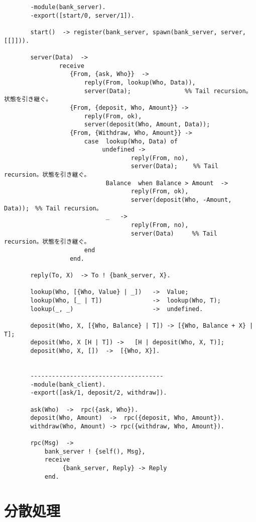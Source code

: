 \begin{verbatim}
    　　-module(bank_server).
    　　-export([start/0, server/1]).
    　　
    　　start()  -> register(bank_server, spawn(bank_server, server, [[]])).
    　　
    　　server(Data)  ->
    　　        receive
    　　           {From, {ask, Who}}  ->
    　　               reply(From, lookup(Who, Data)),
    　　               server(Data);　　　　　　　　　%% Tail recursion。状態を引き継ぐ。
    　　           {From, {deposit, Who, Amount}} -> 
    　　               reply(From, ok),
    　　               server(deposit(Who, Amount, Data));
    　　           {From, {Withdraw, Who, Amount}} ->
    　　               case  lookup(Who, Data) of 
    　　                    undefined ->
    　　                            reply(From, no),
    　　                            server(Data);　　 %% Tail recursion。状態を引き継ぐ。
    　　                     Balance  when Balance > Amount  ->
    　　                            reply(From, ok),
    　　                            server(deposit(Who, -Amount, Data));　%% Tail recursion。
    　　                     _   ->
    　　                            reply(From, no),
    　　                            server(Data)　　　%% Tail recursion。状態を引き継ぐ。
    　　               end
    　　           end.
    　　
    　　reply(To, X)  -> To ! {bank_server, X}.
    　　
    　　lookup(Who, [{Who, Value} | _])   ->  Value;
    　　lookup(Who, [_ | T])              ->  lookup(Who, T);
    　　lookup(_, _)                      ->  undefined.
    　　
    　　deposit(Who, X, [{Who, Balance} | T]) -> [{Who, Balance + X} | T];
    　　deposit(Who, X [H | T]) ->   [H | deposit(Who, X, T)];
    　　deposit(Who, X, [])  ->  [{Who, X}].
    　　
    　　
    　　-------------------------------------
    　　-module(bank_client).
    　　-export([ask/1, deposit/2, withdraw]).
    　　
    　　ask(Who)  ->  rpc({ask, Who}).
    　　deposit(Who, Amount)  ->  rpc({deposit, Who, Amount}).
    　　withdraw(Who, Amount) -> rpc({withdraw, Who, Amount}).
    　　
    　　rpc(Msg)  ->
    　　    bank_server ! {self(), Msg},
    　　    receive
    　　         {bank_server, Reply} -> Reply
    　　    end.

\end{verbatim} 
    

\section{分散処理}

